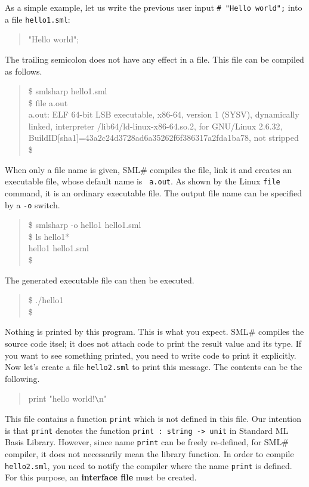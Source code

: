 \documentclass{jbook}
\newcommand{\smlsharp}{SML\#}
\newenvironment{program}{\begin{quote}\begin{tt}}%
                        {\end{tt}\end{quote}}
\begin{document}
	As a simple example, let us write the previous user input
{\tt \# "Hello world";} into a file {\tt hello1.sml}:
\begin{program}
"Hello world";
\end{program}
	The trailing semicolon does not have any effect in a file.
	This file can be compiled as follows.
\begin{program}
\$ smlsharp hello1.sml\\
\$ file a.out\\
a.out: ELF 64-bit LSB executable, x86-64,
version 1 (SYSV), dynamically linked,
interpreter /lib64/ld-linux-x86-64.so.2,
for GNU/Linux 2.6.32,
BuildID[sha1]=43a2c24d3728ad6a35262f6f386317a2fda1ba78,
not stripped\\
\$
\end{program}
	When only a file name is given, \smlsharp{} compiles the file,
link it and creates an executable file, whose default name is {\tt
a.out}.
	As shown by the Linux {\tt file} command, it is an ordinary
executable file.
	The output file name can be specified by a {\tt -o} switch.
\begin{program}
\$ smlsharp -o hello1 hello1.sml\\
\$ ls hello1*\\
hello1   hello1.sml\\
\$ 
\end{program}
	The generated executable file can then be executed.
\begin{program}
\$ ./hello1\\
\$ 
\end{program}
	Nothing is printed by this program.
	This is what you expect.
	\smlsharp{} compiles the source code itsel; it does not attach
code to print the result value and its type.
	If you want to see something printed, you need to write code
to print it explicitly.
	Now let's create a file {\tt hello2.sml} to print this message.
	The contents can be the following.
\begin{program}
print "hello world!\verb|\|n"
\end{program}
	This file contains a function {\tt print} which is not defined
in this file.
	Our intention is that {\tt print} denotes the function
{\tt print : string -> unit} in Standard ML Basis Library.
	However, since name {\tt print} can be freely re-defined,
for \smlsharp{} compiler, it does not necessarily mean the library
function.
	In order to compile {\tt hello2.sml}, you need to notify the
compiler where the name {\tt print} is defined.
	For this purpose, an {\bf interface file} must be created.
\end{document}
